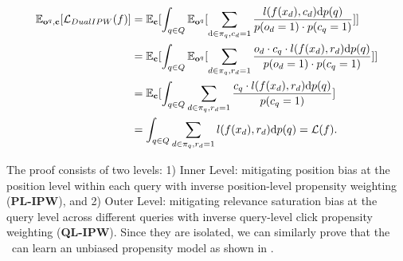 \begin{footnotesize}
\label{proof}
\begin{align}
\mathbb{E}_{\mathbf{o}^q,\mathbf{c}}[\mathcal{L}_{DualIPW}(f)]
&=\mathbb{E}_{\mathbf{c}}[\int_{q\in Q}\mathbb{E}_{\mathbf{o}^q}[\sum_{\text{d}\in \pi_q, c_d=1}\frac{ l(f(x_d),c_d)\text{d}p(q)}{p(o_d=1)\cdot p(c_q=1)}]]\nonumber\\
&=\mathbb{E}_{\mathbf{c}}[\int_{q\in Q}\mathbb{E}_{\mathbf{o}^q}[\sum_{d\in \pi_q, r_d=1}\frac{o_d\cdot c_q\cdot l(f(x_d),r_d)\text{d}p(q)}{p(o_d=1)\cdot p(c_q=1)}]]\nonumber\\
&=\mathbb{E}_{\mathbf{c}}[\int_{q\in Q}\sum_{d\in \pi_q, r_d=1}\frac{c_q\cdot l(f(x_d),r_d)\text{d}p(q)}{p(c_q=1)}]\\
&=\int_{q\in Q} \sum_{d\in \pi_q,r_d=1} l(f(x_d),r_d)\text{d}p(q)=\mathcal{L}(f)\nonumber\text{.}
\end{align}\end{footnotesize}The proof consists of two levels: 1) Inner Level: mitigating position bias at the position level within each query with inverse position-level propensity weighting (\textbf{PL-IPW}), and 2) Outer Level: mitigating relevance saturation bias at the query level across different queries with inverse query-level click propensity weighting (\textbf{QL-IPW}). Since they are isolated, we can similarly prove that the \m~can learn an unbiased propensity model as shown in \cite{ai2018unbiased}.

